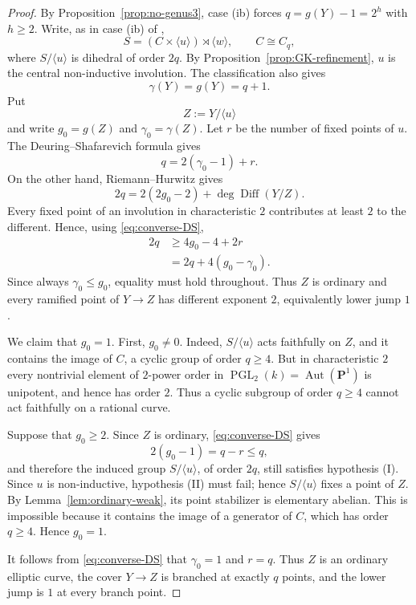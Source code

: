 \documentclass[11pt]{article}
\theoremstyle{remark}
\newcommand{\Aut}{\operatorname{Aut}}
\begin{document}
\begin{proof}
By Proposition~\ref{prop:no-genus3}, case \textup{(ib)} forces
$q=g(Y)-1=2^h$ with $h\ge2$.  Write, as in case \textup{(ib)} of
\cite[Theorem~1.2]{GK2015},
\[
        S=(C\times\langle u\rangle)\rtimes\langle w\rangle,
        \qquad C\cong C_q,
\]
where $S/\langle u\rangle$ is dihedral of order $2q$.  By
Proposition~\ref{prop:GK-refinement}, $u$ is the central non-inductive
involution.  The classification also
gives
\[
        \gamma(Y)=g(Y)=q+1.
\]
Put
\[
        Z:=Y/\langle u\rangle
\]
and write $g_0=g(Z)$ and $\gamma_0=\gamma(Z)$.  Let $r$ be the
number of fixed points of $u$.  The Deuring--Shafarevich formula gives
\begin{equation}\label{eq:converse-DS}
        q=2(\gamma_0-1)+r.
\end{equation}
On the other hand, Riemann--Hurwitz gives
\[
        2q=2(2g_0-2)+\deg\operatorname{Diff}(Y/Z).
\]
Every fixed point of an involution in characteristic $2$ contributes at
least $2$ to the different.  Hence, using \eqref{eq:converse-DS},
\[
\begin{aligned}
        2q
        &\ge 4g_0-4+2r\\
        &=2q+4(g_0-\gamma_0).
\end{aligned}
\]
Since always $\gamma_0\le g_0$, equality must hold throughout.  Thus
$Z$ is ordinary and every ramified point of $Y\to Z$ has different
exponent $2$, equivalently lower jump $1$.

We claim that $g_0=1$.  First, $g_0\ne0$.  Indeed,
$S/\langle u\rangle$ acts faithfully on $Z$, and it contains the image
of $C$, a cyclic group of order $q\ge4$.  But in characteristic $2$ every nontrivial element of
$2$-power order in $\operatorname{PGL}_2(k)=\Aut(\mathbf P^1)$ is
unipotent, and hence has order $2$.  Thus a cyclic subgroup of order
$q\ge4$ cannot act faithfully on a rational curve.

Suppose that $g_0\ge2$.  Since $Z$ is ordinary,
\eqref{eq:converse-DS} gives
\[
        2(g_0-1)=q-r\le q,
\]
and therefore the induced group $S/\langle u\rangle$, of order $2q$,
still satisfies hypothesis \textup{(I)}.  Since $u$ is non-inductive,
hypothesis \textup{(II)} must fail; hence $S/\langle u\rangle$ fixes a
point of $Z$.  By Lemma~\ref{lem:ordinary-weak}, its point stabilizer is
elementary abelian.  This is impossible because it contains the image of
a generator of $C$, which has order $q\ge4$.  Hence $g_0=1$.

It follows from \eqref{eq:converse-DS} that $\gamma_0=1$ and $r=q$.
Thus $Z$ is an ordinary elliptic curve, the cover $Y\to Z$ is
branched at exactly $q$ points, and the lower jump is $1$ at every branch
point.


\end{proof}
\end{document}
